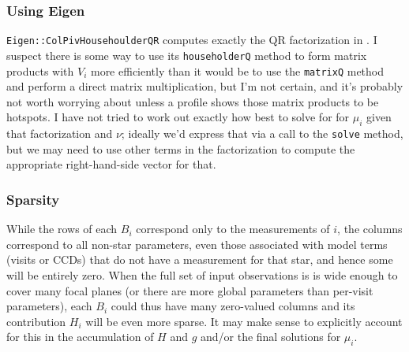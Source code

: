 \subsubsection{Using Eigen}

\texttt{Eigen::ColPivHousehoulderQR} computes exactly the QR factorization in .
I suspect there is some way to use its \texttt{householderQ} method to form matrix products with $V_i$ more efficiently than it would be to use the \texttt{matrixQ} method and perform a direct matrix multiplication, but I'm not certain, and it's probably not worth worrying about unless a profile shows those matrix products to be hotspots.
I have not tried to work out exactly how best to solve for for $\mu_i$ given that factorization and $\nu$; ideally we'd express that via a call to the \texttt{solve} method, but we may need to use other terms in the factorization to compute the appropriate right-hand-side vector for that.

\subsubsection{Sparsity}

While the rows of each $B_i$ correspond only to the measurements of  $i$, the columns correspond to all non-star parameters, even those associated with model terms (visits or CCDs) that do not have a measurement for that star, and hence some will be entirely zero.
When the full set of input observations is is wide enough to cover many focal planes (or there are more global parameters than per-visit parameters), each $B_i$ could thus have many zero-valued columns and its contribution $H_i$ will be even more sparse.
It may make sense to explicitly account for this in the accumulation of $H$ and $g$ and/or the final solutions for $\mu_i$.

